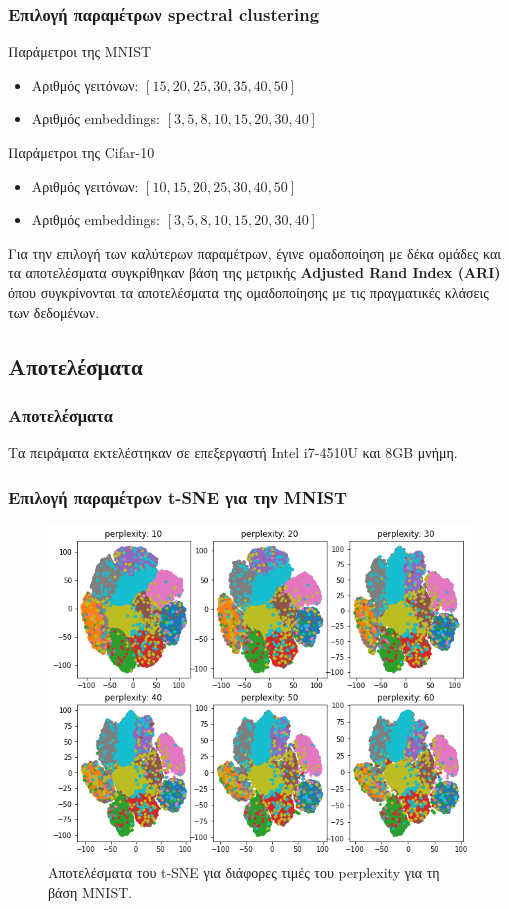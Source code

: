 \documentclass{beamer}
\begin{document}
\begin{frame}
\frametitle{Επιλογή παραμέτρων spectral clustering}

\begin{block}{Παράμετροι της MNIST}
\begin{itemize}
\item Αριθμός γειτόνων: $[15, 20, 25, 30, 35, 40, 50]$
\item Αριθμός embeddings: $[3, 5, 8, 10, 15, 20, 30, 40]$
\end{itemize}
\end{block} \pause

\begin{block}{Παράμετροι της Cifar-10}
\begin{itemize}
\item Αριθμός γειτόνων: $[10, 15, 20, 25, 30, 40, 50]$
\item Αριθμός embeddings: $[3, 5, 8, 10, 15, 20, 30, 40]$
\end{itemize}
\end{block} \pause

Για την επιλογή των καλύτερων παραμέτρων, έγινε ομαδοποίηση με δέκα ομάδες και
τα αποτελέσματα συγκρίθηκαν βάση της μετρικής \textbf{Adjusted Rand Index (ARI)}
όπου συγκρίνονται τα αποτελέσματα της ομαδοποίησης με τις πραγματικές κλάσεις
των δεδομένων.

\end{frame}

\subsection{Αποτελέσματα}

\begin{frame}
\frametitle{Αποτελέσματα}

Τα πειράματα εκτελέστηκαν σε επεξεργαστή Intel i7-4510U και 8GB μνήμη.

\end{frame}

\begin{frame}
\frametitle{Επιλογή παραμέτρων t-SNE για την MNIST}

\begin{figure}[H]
    \centering
    \includegraphics[width=0.6\linewidth]{mnist/tsne_all.png}
    \caption{Αποτελέσματα του t-SNE για διάφορες τιμές του perplexity για τη
    βάση MNIST.}
    \label{fig:mnist_tsne_all}
\end{figure}

\end{frame}
\end{document}
